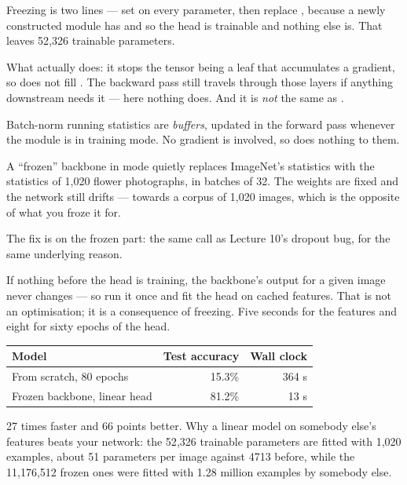 \documentclass[11pt,a4paper]{article}
\begin{document}
Freezing is two lines --- set  on every parameter,
then replace , because a newly constructed module has
 and so the head is trainable and nothing else is.
That leaves 52{,}326 trainable parameters.

What  actually does: it stops the tensor being a
leaf that accumulates a gradient, so  does not fill
. The backward pass still travels through those layers if anything
downstream needs it --- here nothing does. And it is \emph{not} the same as
.

\begin{failbox}[title={Failure condition --- freezing weights does not freeze a network}]
Batch-norm running statistics are \emph{buffers}, updated in the forward pass
whenever the module is in training mode. No gradient is involved, so
 does nothing to them.

A ``frozen'' backbone in  mode quietly replaces ImageNet's
statistics with the statistics of 1{,}020 flower photographs, in batches of 32.
The weights are fixed and the network still drifts --- towards a corpus of
1{,}020 images, which is the opposite of what you froze it for.

The fix is  on the frozen part: the same call as Lecture 10's
dropout bug, for the same underlying reason.
\end{failbox}

If nothing before the head is training, the backbone's output for a given image
never changes --- so run it once and fit the head on cached features. That is
not an optimisation; it is a consequence of freezing. Five seconds for the
features and eight for sixty epochs of the head.

\begin{center}
\small
\begin{tabular}{lrr}
\toprule
\textbf{Model} & \textbf{Test accuracy} & \textbf{Wall clock} \\
\midrule
From scratch, 80 epochs & 15.3\% & 364 s \\
Frozen backbone, linear head & 81.2\% & 13 s \\
\bottomrule
\end{tabular}
\end{center}

27 times faster and 66 points better. Why a linear model on somebody else's
features beats your network: the 52{,}326 trainable parameters are fitted with
1{,}020 examples, about 51 parameters per image against 4713 before, while the
11{,}176{,}512 frozen ones were fitted with 1.28 million examples by somebody
else.
\end{document}
